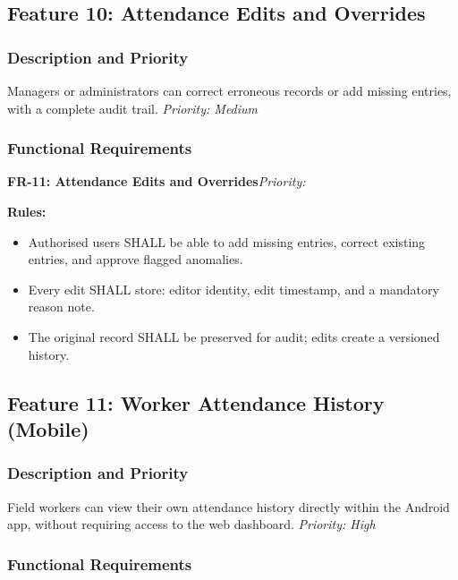 \documentclass[12pt, a4paper]{article}
\newcommand{\frblock}[2]{%
    \noindent\textbf{#1}\hfill\textit{Priority: #2}%
    \par\smallskip%
}
\newcommand{\srsfield}[1]{\noindent\textbf{#1:}\par}
\begin{document}
\subsection{Feature 10: Attendance Edits and Overrides}

\subsubsection*{Description and Priority}
Managers or administrators can correct erroneous records or add missing
entries, with a complete audit trail.
\hfill \textit{Priority: Medium}

\subsubsection*{Functional Requirements}

\frblock{FR-11: Attendance Edits and Overrides}{}

\srsfield{Rules}
\begin{itemize}
    \item Authorised users SHALL be able to add missing entries, correct
          existing entries, and approve flagged anomalies.
    \item Every edit SHALL store: editor identity, edit timestamp, and a
          mandatory reason note.
    \item The original record SHALL be preserved for audit; edits create
          a versioned history.
\end{itemize}

\subsection{Feature 11: Worker Attendance History (Mobile)}

\subsubsection*{Description and Priority}
Field workers can view their own attendance history directly within the
Android app, without requiring access to the web dashboard.
\hfill \textit{Priority: High}

\subsubsection*{Functional Requirements}
\end{document}

